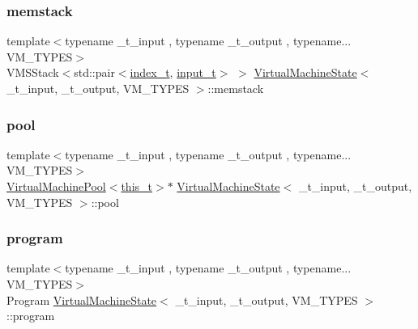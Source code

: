 \mbox{\label{class_virtual_machine_state_a27df19177ca8ede5d88bf51cff785c00}} 
\subsubsection{\texorpdfstring{memstack}{memstack}}
{\footnotesize\ttfamily template$<$typename \+\_\+t\+\_\+input , typename \+\_\+t\+\_\+output , typename... V\+M\+\_\+\+T\+Y\+P\+ES$>$ \\
V\+M\+S\+Stack$<$std\+::pair$<$\hyperlink{class_virtual_machine_state_a95ba2f54f65b778c8a012ea3e7a0ee50}{index\+\_\+t}, \hyperlink{class_virtual_machine_state_aeb5e01ec57466fd3734e0c29f2b8da0a}{input\+\_\+t}$>$ $>$ \hyperlink{class_virtual_machine_state}{Virtual\+Machine\+State}$<$ \+\_\+t\+\_\+input, \+\_\+t\+\_\+output, V\+M\+\_\+\+T\+Y\+P\+ES $>$\+::memstack}

\mbox{\label{class_virtual_machine_state_a68860cf7a2971d7f8c4b817d360d7b43}} 
\subsubsection{\texorpdfstring{pool}{pool}}
{\footnotesize\ttfamily template$<$typename \+\_\+t\+\_\+input , typename \+\_\+t\+\_\+output , typename... V\+M\+\_\+\+T\+Y\+P\+ES$>$ \\
\hyperlink{class_virtual_machine_pool}{Virtual\+Machine\+Pool}$<$\hyperlink{class_virtual_machine_state_ada0e1bebef2d73581c6adcd55f8be521}{this\+\_\+t}$>$$\ast$ \hyperlink{class_virtual_machine_state}{Virtual\+Machine\+State}$<$ \+\_\+t\+\_\+input, \+\_\+t\+\_\+output, V\+M\+\_\+\+T\+Y\+P\+ES $>$\+::pool}

\mbox{\label{class_virtual_machine_state_aa9204cc7523092fdc3d3e53e881bc841}} 
\subsubsection{\texorpdfstring{program}{program}}
{\footnotesize\ttfamily template$<$typename \+\_\+t\+\_\+input , typename \+\_\+t\+\_\+output , typename... V\+M\+\_\+\+T\+Y\+P\+ES$>$ \\
Program \hyperlink{class_virtual_machine_state}{Virtual\+Machine\+State}$<$ \+\_\+t\+\_\+input, \+\_\+t\+\_\+output, V\+M\+\_\+\+T\+Y\+P\+ES $>$\+::program}

